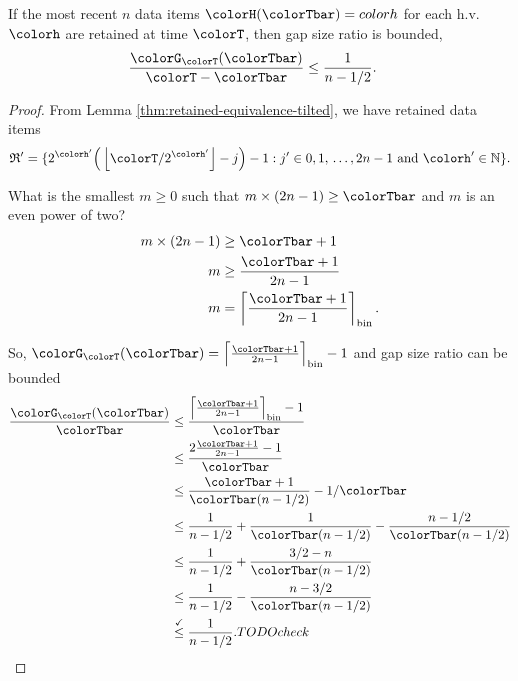 \begin{lemma}
\label{thm:gap-size-ratio-tilted}
If the most recent $n$ data items $\colorH(\colorTbar) = colorh$ for each h.v. $\colorh$ are retained at time $\colorT$, then gap size ratio is bounded,
\begin{align*}
\frac{\colorG_{\colorT}(\colorTbar)}{\colorT - \colorTbar}
&\leq
\frac{1}{n - 1/2}.
\end{align*}
\end{lemma}
\begin{proof}

From Lemma \ref{thm:retained-equivalence-tilted}, we have retained data items
\begin{align*}
\mathfrak{R}' =
\{
2^{\colorh'}\Big(\left\lfloor \colorT / 2^{\colorh'} \right\rfloor - j\Big) - 1
  :
  j' \in 0,1,\,\ldots,2n-1
  \text{ and }
  \colorh' \in \mathbb{N}
\}.
\end{align*}


What is the smallest $m \geq 0$ such that $m \times (2n - 1) \geq \colorTbar$ and $m$ is an even power of two?
\begin{align*}
m \times (2n - 1)
&\geq \colorTbar + 1\\
m
&\geq \frac{\colorTbar + 1}{2n - 1}\\
m
&= \left\lceil \frac{\colorTbar + 1 }{2n - 1} \right\rceil_{\mathrm{bin}}.
\end{align*}

So, $\colorG_{\colorT}(\colorTbar) = \left\lceil \frac{\colorTbar + 1 }{2n - 1} \right\rceil_{\mathrm{bin}} - 1$ and gap size ratio can be bounded
\begin{align*}
\frac{\colorG_{\colorT}(\colorTbar)}{\colorTbar}
&\leq
\frac{
\left\lceil \frac{\colorTbar + 1 }{2n - 1} \right\rceil_{\mathrm{bin}} - 1
}{
\colorTbar
}\\
&\leq
\frac{
2\frac{\colorTbar + 1}{2n - 1} - 1
}{
\colorTbar
}\\
&\leq
\frac{\colorTbar + 1}{\colorTbar(n - 1/2)} - 1/\colorTbar\\
&\leq
\frac{1}{n - 1/2} + \frac{1}{\colorTbar(n - 1/2)} - \frac{n - 1/2}{\colorTbar(n - 1/2)}\\
&\leq
\frac{1}{n - 1/2} + \frac{3/2 - n}{\colorTbar(n - 1/2)}\\
&\leq
\frac{1}{n - 1/2} - \frac{n - 3/2}{\colorTbar(n - 1/2)}\\
&\stackrel{\checkmark}{\leq}
\frac{1}{n - 1/2}. TODO check
\end{align*}

\end{proof}
